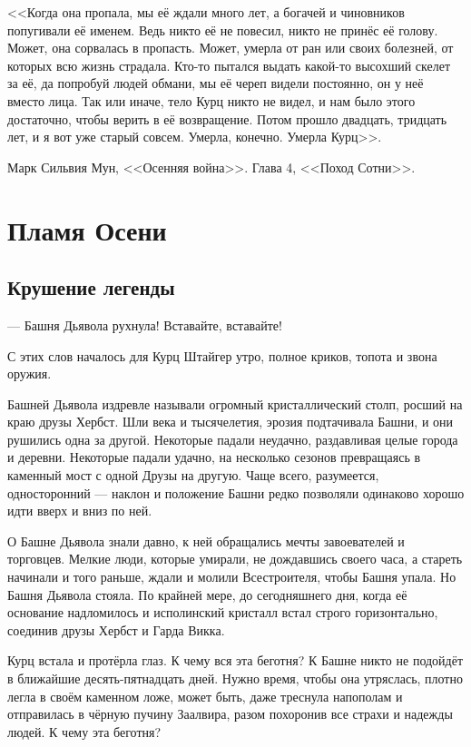<<Когда она пропала, мы её ждали много лет, а богачей и чиновников попугивали её именем.
Ведь никто её не повесил, никто не принёс её голову.
Может, она сорвалась в пропасть.
Может, умерла от ран или своих болезней, от которых всю жизнь страдала.
Кто-то пытался выдать какой-то высохший скелет за её, да попробуй людей обмани, мы её череп видели постоянно, он у неё вместо лица.
Так или иначе, тело Курц никто не видел, и нам было этого достаточно, чтобы верить в её возвращение.
Потом прошло двадцать, тридцать лет, и я вот уже старый совсем.
Умерла, конечно.
Умерла Курц>>.

Марк Сильвия Мун, <<Осенняя война>>.
Глава 4, <<Поход Сотни>>.


\chapter{Пламя Осени}

\section{Крушение легенды}

--- Башня Дьявола рухнула!
Вставайте, вставайте!

С этих слов началось для Курц Штайгер утро, полное криков, топота и звона оружия.

Башней Дьявола издревле называли огромный кристаллический столп, росший на краю друзы Хербст.
Шли века и тысячелетия, эрозия подтачивала Башни, и они рушились одна за другой.
Некоторые падали неудачно, раздавливая целые города и деревни.
Некоторые падали удачно, на несколько сезонов превращаясь в каменный мост с одной Друзы на другую.
Чаще всего, разумеется, односторонний --- наклон и положение Башни редко позволяли одинаково хорошо идти вверх и вниз по ней.

О Башне Дьявола знали давно, к ней обращались мечты завоевателей и торговцев.
Мелкие люди, которые умирали, не дождавшись своего часа, а стареть начинали и того раньше, ждали и молили Всестроителя, чтобы Башня упала.
Но Башня Дьявола стояла.
По крайней мере, до сегодняшнего дня, когда её основание надломилось и исполинский кристалл встал строго горизонтально, соединив друзы Хербст и Гарда Викка.

Курц встала и протёрла глаз.
К чему вся эта беготня?
К Башне никто не подойдёт в ближайшие десять-пятнадцать дней.
Нужно время, чтобы она утряслась, плотно легла в своём каменном ложе, может быть, даже треснула напополам и отправилась в чёрную пучину Заалвира, разом похоронив все страхи и надежды людей.
К чему эта беготня?

